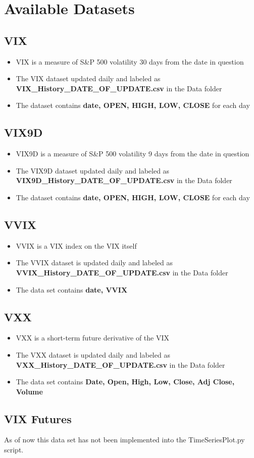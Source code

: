 \documentclass{article}
\begin{document}
\section*{Available Datasets}

\subsection*{VIX}
\begin{itemize}
    \item VIX is a measure of S\&P 500 volatility 30 days from the date in question
    \item The VIX dataset updated daily and labeled as \textbf{VIX\_History\_DATE\_OF\_UPDATE.csv} in the Data folder
    \item The dataset contains \textbf{date, OPEN, HIGH, LOW, CLOSE} for each day
\end{itemize}

\subsection*{VIX9D}
\begin{itemize}
    \item VIX9D is a measure of S\&P 500 volatility 9 days from the date in question
    \item The VIX9D dataset updated daily and labeled as \textbf{VIX9D\_History\_DATE\_OF\_UPDATE.csv} in the Data folder
    \item The dataset contains \textbf{date, OPEN, HIGH, LOW, CLOSE} for each day
\end{itemize}

\subsection*{VVIX}
\begin{itemize}
    \item VVIX is a VIX index on the VIX itself
    \item The VVIX dataset is updated daily and labeled as \textbf{VVIX\_History\_DATE\_OF\_UPDATE.csv} in the Data folder
    \item The data set contains \textbf{date, VVIX}
\end{itemize}

\subsection*{VXX}
\begin{itemize}
    \item VXX is a short-term future derivative of the VIX
    \item The VXX dataset is updated daily and labeled as \textbf{VXX\_History\_DATE\_OF\_UPDATE.csv} in the Data folder
    \item The data set contains \textbf{Date, Open, High, Low, Close, Adj Close, Volume}
\end{itemize}

\subsection*{VIX Futures}
As of now this data set has not been implemented into the TimeSeriesPlot.py script. 
\end{document}
